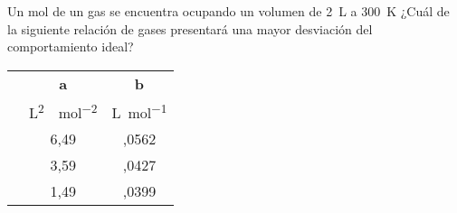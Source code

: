 Un mol de un gas se encuentra ocupando un volumen de \SI{2}{\liter} a \SI{300}{\kelvin} ¿Cuál de la siguiente relación de gases presentará una mayor desviación del comportamiento ideal?
\begin{center}
	\begin{tabular}{lSS}
		\toprule
					&\textbf{a} 	& \textbf{b} 	\\
					&\si{\square\liter\atm\per\square\mol}&\si{\liter\per\mol}\\
		\midrule
				& 6,49		& ,0562 	\\
			 	& 3,59		& ,0427 	\\
			  	& 1,49		& ,0399 	\\
		\bottomrule
	\end{tabular}
\end{center}
